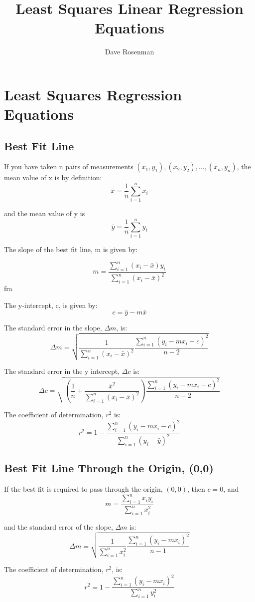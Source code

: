 \documentclass{article}
\title{Least Squares Linear Regression Equations}
\author{Dave Rosenman}
\begin{document}
	\maketitle
	\tableofcontents
	\newpage
\section{Least Squares Regression Equations}
\subsection{Best Fit Line}	
If you have taken $\mathrm{n}$ pairs of measurements $(x_1,y_1),(x_2,y_2),...,(x_n,y_n)$, the mean value of $\mathrm{x}$ is by definition:
$$\bar{x} = \frac{1}{n}\sum_{i=1}^n{x_i}$$

and the mean value of $\mathrm{y}$ is 
$$\bar{y} = \frac{1}{n}\sum_{i=1}^n{y_i}$$


The slope of the best fit line, $\mathrm{m}$ is given by:

$$m = \frac{\sum_{i=1}^n{(x_i - \bar{x})y_i}}{\sum_{i=1}^n{(x_i - \bar{x})^2}}
$$fra


The $\mathrm{y}$-intercept, $\mathrm{c}$, is given by:
$$c = \bar{y} - m\bar{x}$$


The standard error in the slope, $\Delta m$, is:
$$\Delta m = \sqrt{\frac{1}{\sum_{i=1}^n{(x_i - \bar{x})^2}}\frac{\sum_{i=1}^n{(y_i - mx_i - c )^2}}{n-2}}$$


The standard error in the y intercept, $\Delta c$ is:
$$\Delta c = \sqrt{\left(\frac{1}{n} + \frac{\bar{x}^2}{\sum_{i=1}^n{(x_i-\bar{x})^2}}\right)\frac{\sum_{i=1}^n{(y_i - mx_i - c )^2}}{n-2}}$$

The coefficient of determination, $r^2$ is:
$${r^2} = 1 - \frac{{\sum\limits_{i = 1}^n {{{\left( {{y_i} - m{x_i} - c} \right)}^2}} }}{{\sum\limits_{i = 1}^n {{{\left( {{y_i} - \bar y} \right)}^2}} }}$$

\subsection{Best Fit Line Through the Origin, (0,0)}
If the best fit is required to pass through the origin, $(0,0)$, then $c = 0$, and 
$$m = \frac{\sum_{i=1}^n{x_iy_i}}{\sum_{i=1}^n{x_i^2}}$$


and the standard error of the slope, $\Delta m$ is:
$$\Delta m = \sqrt{\frac{1}{\sum_{i=1}^n{x_i^2}}\frac{\sum_{i=1}^n(y_i - mx_i)^2}{n-1}}$$

The coefficient of determination, $r^2$, is:
$${r^2} = 1 - \frac{{\sum\limits_{i = 1}^n {{{\left( {{y_i} - m{x_i}} \right)}^2}} }}{{\sum\limits_{i = 1}^n {{y_i^2}} }}$$
\end{document}
